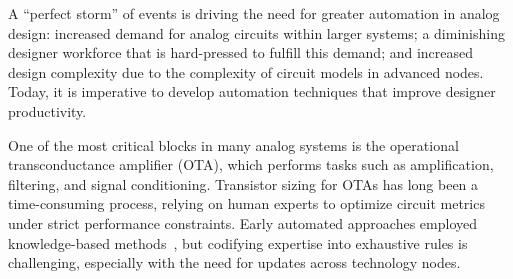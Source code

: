 
\noindent
A ``perfect storm'' of events is driving the need for greater automation in analog design: increased demand for analog circuits within larger systems; a diminishing designer workforce that is hard-pressed to fulfill this demand; and increased design complexity due to the complexity of circuit models in advanced nodes. Today, it is imperative to develop automation techniques that improve designer productivity. 

One of the most critical blocks in many analog systems is the operational transconductance amplifier (OTA), which performs tasks such as amplification, filtering, and signal conditioning.  Transistor sizing for OTAs has long been a time-consuming process, relying on human experts to optimize circuit metrics under strict performance constraints. Early automated approaches employed knowledge-based methods~\cite{harjani_89}, but codifying expertise into exhaustive rules is challenging, especially with the need for updates across technology nodes. 

